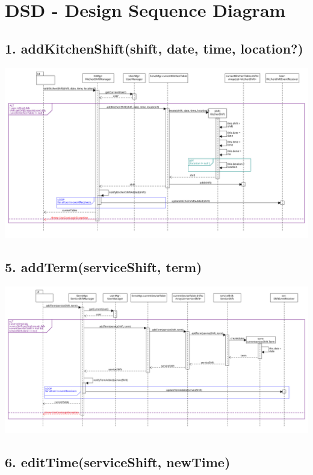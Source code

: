 \chapter{DSD - Design Sequence Diagram}

\section*{1. addKitchenShift(shift, date, time, location?)}

\begin{center}
  \includegraphics[scale = 0.3]{images/DSD/Esame DSD 1.png}
\end{center}

\section*{5. addTerm(serviceShift, term)}

\begin{center}
  \includegraphics[scale = 0.28]{images/DSD/Esame DSD 5.png}
\end{center}

\section*{6. editTime(serviceShift, newTime)}


